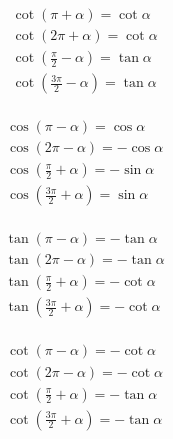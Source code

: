 \documentclass[a4paper, fleqn, fontset = mac]{ctexart}
\begin{document}
	\noindent
	\begin{minipage}{0.2\textwidth}
	\small
	\begin{align*}
		& \cot\left( \pi + \alpha \right) = \cot\alpha \\
		& \cot\left( 2\pi + \alpha \right) = \cot\alpha \\
		& \cot\left( \frac\pi2 - \alpha \right) = \tan\alpha \\
		& \cot\left( \frac{3\pi}2 - \alpha \right) = \tan\alpha \\
	\end{align*}
	\end{minipage}
	\begin{minipage}{0.2\textwidth}
	\small
	\begin{align*}
		& \cos\left( \pi - \alpha \right) = \cos\alpha \\
		& \cos\left( 2\pi - \alpha \right) = -\cos\alpha \\
		& \cos\left( \frac\pi2 + \alpha \right) = -\sin\alpha \\
		& \cos\left( \frac{3\pi}2 + \alpha \right) = \sin\alpha \\
	\end{align*}
	\end{minipage}
	\begin{minipage}{0.2\textwidth}
	\small
	\begin{align*}
		& \tan\left( \pi - \alpha \right) = -\tan\alpha \\
		& \tan\left( 2\pi - \alpha \right) = -\tan\alpha \\
		& \tan\left( \frac\pi2 + \alpha \right) = -\cot\alpha \\
		& \tan\left( \frac{3\pi}2 + \alpha \right) = -\cot\alpha \\
	\end{align*}
	\end{minipage}
	\begin{minipage}{0.2\textwidth}
	\small
	\begin{align*}
		& \cot\left( \pi - \alpha \right) = -\cot\alpha \\
		& \cot\left( 2\pi - \alpha \right) = -\cot\alpha \\
		& \cot\left( \frac\pi2 + \alpha \right) = -\tan\alpha \\
		& \cot\left( \frac{3\pi}2 + \alpha \right) = -\tan\alpha \\
	\end{align*}
	\end{minipage}
		
\end{document}
